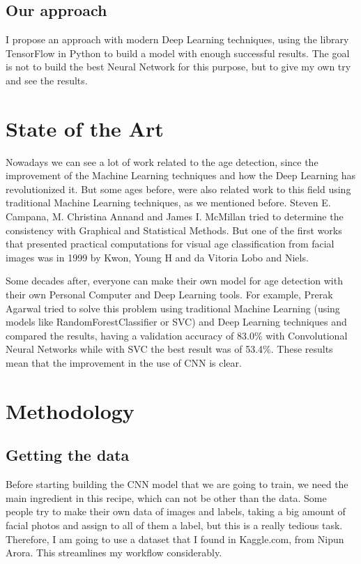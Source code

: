 \documentclass{article}
\begin{document}
\subsection{Our approach}
I propose an approach with modern Deep Learning techniques, using the library TensorFlow\cite{tensorflow} in Python\cite{python} to build a model with enough successful results. The goal is not to build the best Neural Network for this purpose, but to give my own try and see the results.


\section{State of the Art}
\label{sec:state_of_the_art}

Nowadays we can see a lot of work related to the age detection, since the improvement of the Machine Learning techniques and how the Deep Learning has revolutionized it. But some ages before, were also related work to this field using traditional Machine Learning techniques, as we mentioned before\cite{wallinga2002detection}. Steven E. Campana, M. Christina Annand and James I. McMillan tried to determine the consistency with Graphical and Statistical Methods\cite{campana1995graphical}. But one of the first works that presented practical computations for visual age classification from facial images was in 1999 by Kwon, Young H and da Vitoria Lobo and Niels\cite{kwon1999age}.

Some decades after, everyone can make their own model for age detection with their own Personal Computer and Deep Learning tools. For example, Prerak Agarwal\cite{prerak2020} tried to solve this problem using traditional Machine Learning (using models like RandomForestClassifier or SVC) and Deep Learning techniques and compared the results, having a validation accuracy of 83.0\% with Convolutional Neural Networks while with SVC the best result was of 53.4\%. These results mean that the improvement in the use of CNN is clear.


\section{Methodology}\label{sec:methodology}

\subsection{Getting the data}
Before starting building the CNN model that we are going to train, we need the main ingredient in this recipe, which can not be other than the data. Some people try to make their own data of images and labels, taking a big amount of facial photos and assign to all of them a label, but this is a really tedious task. Therefore, I am going to use a dataset that I found in Kaggle.com\cite{nipun2020}, from Nipun Arora. This streamlines my workflow considerably.
\end{document}
